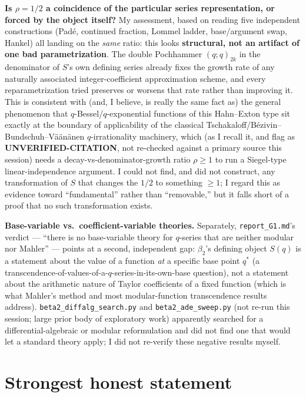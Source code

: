 \documentclass[11pt]{article}
\begin{document}
\textbf{Is $\rho=1/2$ a coincidence of the particular series representation, or forced by the
object itself?} My assessment, based on reading five independent constructions (Padé, continued
fraction, Lommel ladder, base/argument swap, Hankel) all landing on the \emph{same} ratio: this
looks \textbf{structural, not an artifact of one bad parametrization}. The double Pochhammer
$(q;q)_{2k}$ in the denominator of $S$'s own defining series already fixes the growth rate of
any naturally associated integer-coefficient approximation scheme, and every reparametrization
tried preserves or worsens that rate rather than improving it. This is consistent with (and, I
believe, is really the same fact as) the general phenomenon that $q$-Bessel/$q$-exponential
functions of this Hahn--Exton type sit exactly at the boundary of applicability of the classical
Tschakaloff/Bézivin--Bundschuh--Väänänen $q$-irrationality machinery, which (as I recall it, and
flag as \textbf{UNVERIFIED-CITATION}, not re-checked against a primary source this session)
needs a decay-vs-denominator-growth ratio $\rho\ge1$ to run a Siegel-type linear-independence
argument. I could not find, and did not construct, any transformation of $S$ that changes the
$1/2$ to something $\ge1$; I regard this as evidence toward ``fundamental'' rather than
``removable,'' but it falls short of a proof that no such transformation exists.

\textbf{Base-variable vs.\ coefficient-variable theories.} Separately, \texttt{report\_G1.md}'s
verdict --- ``there is no base-variable theory for $q$-series that are neither modular nor
Mahler'' --- points at a second, independent gap: $\beta_2$'s defining object $S(q)$ is a
statement about the value of a function \emph{at} a specific base point $q^\ast$ (a
transcendence-of-values-of-a-$q$-series-in-its-own-base question), not a statement about the
arithmetic nature of Taylor coefficients of a fixed function (which is what Mahler's method and
most modular-function transcendence results address). \texttt{beta2\_diffalg\_search.py} and
\texttt{beta2\_ade\_sweep.py} (not re-run this session; large prior body of exploratory work)
apparently searched for a differential-algebraic or modular reformulation and did not find one
that would let a standard theory apply; I did not re-verify these negative results myself.

\section{Strongest honest statement}
\end{document}

